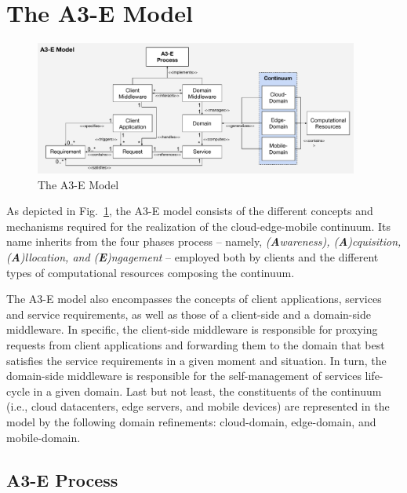 \section{The A3-E Model}\label{sec:proposal}

\begin{figure}[tbp]
	\includegraphics[width=0.95\textwidth]{figs/A3-E-model.pdf}
	\caption{The A3-E Model}
	\label{fig:A3-E-model}
\end{figure}

As depicted in Fig.~\ref{fig:A3-E-model}, the A3-E model consists of the different concepts and mechanisms required for the realization of the cloud-edge-mobile continuum. Its name inherits from the four phases process -- namely, \textit{(\textbf{A}wareness), (\textbf{A})cquisition, (\textbf{A})llocation, and (\textbf{E})ngagement} -- employed both by clients and the different types of computational resources composing the continuum. 

The A3-E model also encompasses the concepts of client applications, services and service requirements, as well as those of a client-side and a domain-side middleware. In specific, the client-side middleware is responsible for proxying requests from client applications and forwarding them to the domain that best satisfies the service requirements in a given moment and situation. In turn, the domain-side middleware is responsible for the self-management of services life-cycle in a given domain. Last but not least, the constituents of the continuum (i.e., cloud datacenters, edge servers, and mobile devices) are represented in the model by the following domain refinements: cloud-domain, edge-domain, and mobile-domain.

\subsection{A3-E Process}\label{sec:A3-E-process}

